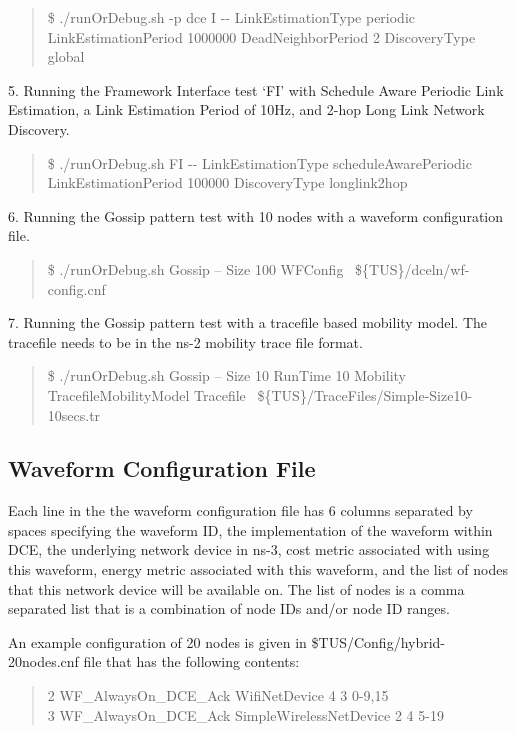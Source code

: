 \begin{quote}
\$ ./runOrDebug.sh -p dce  I -\mbox{}- LinkEstimationType periodic LinkEstimationPeriod 1000000 DeadNeighborPeriod 2 DiscoveryType global\\
\end{quote}
	
5. Running the Framework Interface test `FI' with Schedule Aware
Periodic Link Estimation, a Link Estimation Period of 10Hz, and
2-hop Long Link Network Discovery.

\begin{quote}
\$ ./runOrDebug.sh FI -\mbox{}- LinkEstimationType
scheduleAwarePeriodic LinkEstimationPeriod 100000 DiscoveryType longlink2hop
\end{quote}
	

6. Running the Gossip pattern test with 10 nodes with a waveform configuration file.

\begin{quote}
	\$ ./runOrDebug.sh Gossip -- Size 100 WFConfig ~\$\{TUS\}/dceln/wf-config.cnf  \\
\end{quote}

7. Running the Gossip pattern test with a tracefile based mobility model. The tracefile needs to be in the ns-2 mobility trace file format.

\begin{quote}
	\$ ./runOrDebug.sh Gossip -- Size 10 RunTime 10 Mobility TracefileMobilityModel Tracefile ~\$\{TUS\}/TraceFiles/Simple-Size10-10secs.tr  \\
\end{quote}


\subsection{Waveform Configuration File}
Each line in the the waveform configuration file has 6 columns separated by spaces specifying 
the waveform ID, 
the implementation of the waveform within DCE, 
the underlying network device in ns-3, 
cost metric associated with using this waveform,
energy metric associated with this waveform, 
and the list of nodes that this network device will be available on. 
The list of nodes is a comma separated list that is a combination of node IDs and/or node ID ranges. 

An example configuration of 20 nodes is given in \${TUS}/Config/hybrid-20nodes.cnf file that has the following contents:  

\begin{quote}
2 WF\_AlwaysOn\_DCE\_Ack WifiNetDevice 4 3 0-9,15 \\
3 WF\_AlwaysOn\_DCE\_Ack SimpleWirelessNetDevice 2 4 5-19
\end{quote}

